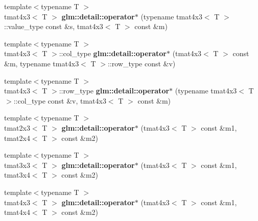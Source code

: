 \begin{DoxyCompactItemize}
\item 
\hypertarget{namespaceglm_1_1detail_ad5b73f2933a146d9f3ceea93b2332247}{{\footnotesize template$<$typename T $>$ }\\tmat4x3$<$ \-T $>$ {\bfseries glm\-::detail\-::operator$\ast$} (typename tmat4x3$<$ \-T $>$\-::value\-\_\-type const \&s, tmat4x3$<$ \-T $>$ const \&m)}\label{namespaceglm_1_1detail_ad5b73f2933a146d9f3ceea93b2332247}

\item 
\hypertarget{namespaceglm_1_1detail_ad251235ecb130ad99b0351bd4446f558}{{\footnotesize template$<$typename T $>$ }\\tmat4x3$<$ \-T $>$\-::col\-\_\-type {\bfseries glm\-::detail\-::operator$\ast$} (tmat4x3$<$ \-T $>$ const \&m, typename tmat4x3$<$ \-T $>$\-::row\-\_\-type const \&v)}\label{namespaceglm_1_1detail_ad251235ecb130ad99b0351bd4446f558}

\item 
\hypertarget{namespaceglm_1_1detail_aebe80e93256837f94f8a593db293e925}{{\footnotesize template$<$typename T $>$ }\\tmat4x3$<$ \-T $>$\-::row\-\_\-type {\bfseries glm\-::detail\-::operator$\ast$} (typename tmat4x3$<$ \-T $>$\-::col\-\_\-type const \&v, tmat4x3$<$ \-T $>$ const \&m)}\label{namespaceglm_1_1detail_aebe80e93256837f94f8a593db293e925}

\item 
\hypertarget{namespaceglm_1_1detail_a609fafd399d022db656a2e829110ea48}{{\footnotesize template$<$typename T $>$ }\\tmat2x3$<$ \-T $>$ {\bfseries glm\-::detail\-::operator$\ast$} (tmat4x3$<$ \-T $>$ const \&m1, tmat2x4$<$ \-T $>$ const \&m2)}\label{namespaceglm_1_1detail_a609fafd399d022db656a2e829110ea48}

\item 
\hypertarget{namespaceglm_1_1detail_a35f4e704d18c350638bfd4ba11db289a}{{\footnotesize template$<$typename T $>$ }\\tmat3x3$<$ \-T $>$ {\bfseries glm\-::detail\-::operator$\ast$} (tmat4x3$<$ \-T $>$ const \&m1, tmat3x4$<$ \-T $>$ const \&m2)}\label{namespaceglm_1_1detail_a35f4e704d18c350638bfd4ba11db289a}

\item 
\hypertarget{namespaceglm_1_1detail_a3db2480e1d00c12b40c0d10ef20c073a}{{\footnotesize template$<$typename T $>$ }\\tmat4x3$<$ \-T $>$ {\bfseries glm\-::detail\-::operator$\ast$} (tmat4x3$<$ \-T $>$ const \&m1, tmat4x4$<$ \-T $>$ const \&m2)}\label{namespaceglm_1_1detail_a3db2480e1d00c12b40c0d10ef20c073a}


\end{DoxyCompactItemize}
